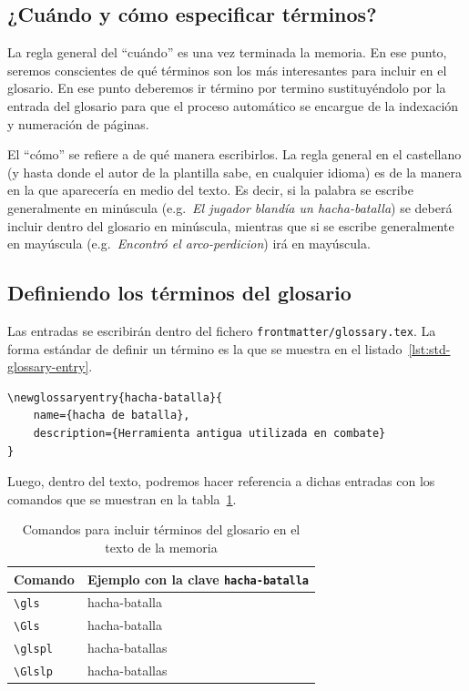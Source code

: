 \documentclass[%
    school=etsisi,%
    type=tfg,%
    degree=61CD,%
]{upm-report}
\begin{document}
\subsection{¿Cuándo y cómo especificar términos?}

La regla general del \enquote{cuándo} es una vez terminada la memoria. En ese punto, seremos conscientes de qué términos son los más interesantes para incluir en el glosario. En ese punto deberemos ir término por termino sustituyéndolo por la entrada del glosario para que el proceso automático se encargue de la indexación y numeración de páginas.

El \enquote{cómo} se refiere a de qué manera escribirlos. La regla general en el castellano (y hasta donde el autor de la plantilla sabe, en cualquier idioma) es de la manera en la que aparecería en medio del texto. Es decir, si la palabra se escribe generalmente en minúscula (e.g.~\textit{El jugador blandía un \gls{hacha-batalla}}) se deberá incluir dentro del glosario en minúscula, mientras que si se escribe generalmente en mayúscula (e.g.~\textit{Encontró el \gls{arco-perdicion}}) irá en mayúscula.

\subsection{Definiendo los términos del glosario}

Las entradas se escribirán dentro del fichero \texttt{frontmatter/glossary.tex}. La forma estándar de definir un término es la que se muestra en el listado~\ref{lst:std-glossary-entry}.

\begin{lstlisting}[language={[latex]TeX},caption=Código para crear una entrada en el glosario,label=lst:std-glossary-entry]
\newglossaryentry{hacha-batalla}{
    name={hacha de batalla},
    description={Herramienta antigua utilizada en combate}
}
\end{lstlisting}

Luego, dentro del texto, podremos hacer referencia a dichas entradas con los comandos que se muestran en la tabla~\ref{tab:glossary-commands}.

\begin{table}
    \caption{\label{tab:glossary-commands}Comandos para incluir términos del glosario en el texto de la memoria}
    \begin{tabularx}{\textwidth}{@{}lX@{}}
        \toprule
        \textbf{Comando} & \textbf{Ejemplo con la clave \texttt{hacha-batalla}} \\
        \midrule
        \texttt{\textbackslash gls} & \gls{hacha-batalla} \\
        \texttt{\textbackslash Gls} & \Gls{hacha-batalla} \\
        \texttt{\textbackslash glspl} & \glspl{hacha-batalla} \\
        \texttt{\textbackslash Glslp} & \Glspl{hacha-batalla} \\
        \bottomrule
    \end{tabularx}
\end{table}
\end{document}
